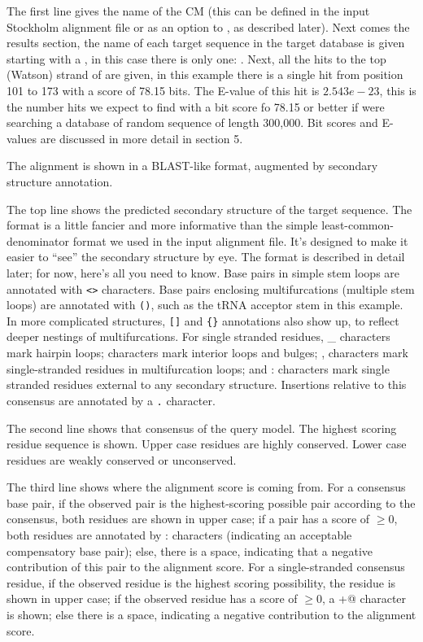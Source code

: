 The first line gives the name of the CM (this can be defined in the
input Stockholm alignment file or as an option to , as
described later). Next comes the results section, the name of each
target sequence in the target database is given starting with a
\prog{$>$}, in this case there is only one: . Next, all
the hits to the top (Watson) strand of  are given, in
this example there is a single hit from position 101 to 173 with a
score of 78.15 bits. The E-value of this hit is $2.543e-23$, this is
the number hits we expect to find with a bit score fo 78.15 or better
if were searching a database of random sequence of length 300,000. 
Bit scores and E-values are discussed in more detail in section 5.

The alignment is shown in a BLAST-like format, augmented by secondary
structure annotation. 

The top line shows the predicted secondary structure of the target
sequence. The format is a little fancier and more informative than the
simple least-common-denominator format we used in the input alignment
file. It's designed to make it easier to ``see'' the secondary
structure by eye. The format is described in detail later; for now,
here's all you need to know. Base pairs in simple stem loops are
annotated with \verb+<>+ characters. Base pairs enclosing
multifurcations (multiple stem loops) are annotated with \verb+()+,
such as the tRNA acceptor stem in this example. In more complicated
structures, \verb+[]+ and \verb+{}+ annotations also show up, to
reflect deeper nestings of multifurcations. For single stranded
residues, \_ characters mark hairpin loops; \- characters mark
interior loops and bulges; , characters mark single-stranded residues
in multifurcation loops; and : characters mark single stranded
residues external to any secondary structure. Insertions relative to
this consensus are annotated by a \verb+.+ character.

The second line shows that consensus of the query model. The highest
scoring residue sequence is shown. Upper case residues are highly
conserved. Lower case residues are weakly conserved or unconserved.

The third line shows where the alignment score is coming from. For a
consensus base pair, if the observed pair is the highest-scoring
possible pair according to the consensus, both residues are shown in
upper case; if a pair has a score of $\geq 0$, both residues are
annotated by : characters (indicating an acceptable compensatory base
pair); else, there is a space, indicating that a negative contribution
of this pair to the alignment score. For a single-stranded consensus
residue, if the observed residue is the highest scoring possibility,
the residue is shown in upper case; if the observed residue has a
score of $\geq 0$, a \verb@+@ character is shown; else there is a
space, indicating a negative contribution to the alignment score.

